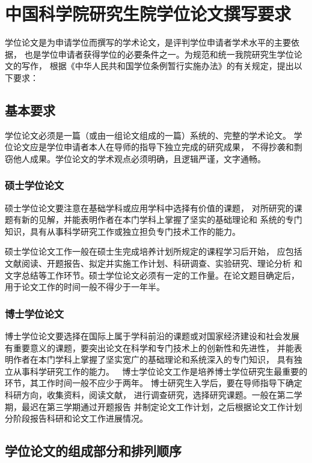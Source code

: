 ﻿
\chapter{中国科学院研究生院学位论文撰写要求}
\label{chap:requires}

学位论文是为申请学位而撰写的学术论文，是评判学位申请者学术水平的主要依据，
也是学位申请者获得学位的必要条件之一。为规范和统一我院研究生学位论文的写作，
根据《中华人民共和国学位条例暂行实施办法》的有关规定，提出以下要求：

\section{基本要求}

学位论文必须是一篇（或由一组论文组成的一篇）系统的、完整的学术论文。
学位论文应是学位申请者本人在导师的指导下独立完成的研究成果，
不得抄袭和剽窃他人成果。学位论文的学术观点必须明确，且逻辑严谨，文字通畅。

\subsection{硕士学位论文}

硕士学位论文要注意在基础学科或应用学科中选择有价值的课题，
对所研究的课题有新的见解，并能表明作者在本门学科上掌握了坚实的基础理论和
系统的专门知识，具有从事科学研究工作或独立担负专门技术工作的能力。

硕士学位论文工作一般在硕士生完成培养计划所规定的课程学习后开始，
应包括文献阅读、开题报告、拟定并实施工作计划、科研调查、实验研究、理论分析
和文字总结等工作环节。硕士学位论文必须有一定的工作量。在论文题目确定后，
用于论文工作的时间一般不得少于一年半。

\subsection{博士学位论文}

博士学位论文要选择在国际上属于学科前沿的课题或对国家经济建设和社会发展
有重要意义的课题，要突出论文在科学和专门技术上的创新性和先进性，
并能表明作者在本门学科上掌握了坚实宽广的基础理论和系统深入的专门知识，
具有独立从事科学研究工作的能力。

博士学位论文工作是培养博士学位研究生最重要的环节，其工作时间一般不应少于两年。
博士研究生入学后，要在导师指导下确定科研方向，收集资料，阅读文献，
进行调查研究，选择研究课题。一般在第二学期，最迟在第三学期通过开题报告
并制定论文工作计划，之后根据论文工作计划分阶段报告科研和论文工作进展情况。

\section{学位论文的组成部分和排列顺序}

